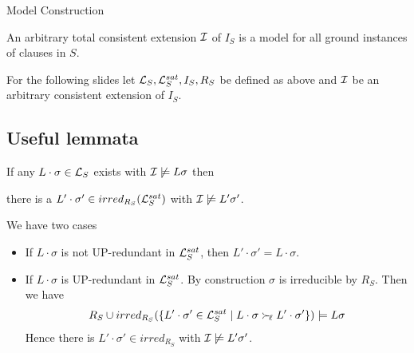 \documentclass[%
handout,
]{beamer}
\begin{document}
\begin{frame}[allowframebreaks]{Model Construction}
        \vspace{1.4em}

        \begin{conjecture}
            An arbitrary total consistent extension $\mathcal{I}$ of $I_S$
            is a model for all ground instances of clauses in $S$.
        \end{conjecture}
        \vspace{1.4em}

        For the following slides let $\mathcal{L}_S,\mathcal{L}_S^{sat}, I_S, R_S$ be defined as above
        and $\mathcal{I}$ be an arbitrary consistent extension of $I_S$.
\end{frame}

\subsection{Useful lemmata}

\begin{frame}
    \begin{lemma}\label{existence}

    If any $L\cdot\sigma\in\mathcal{L}_S$ exists with $\mathcal{I}\not\models L\sigma$ then

    there is a $L'\cdot\sigma'\in irred_{R_S}(\mathcal{L}_S^{sat})$ with $\mathcal{I}\not\models L'\sigma'$.
    \end{lemma}

    \begin{Proof}
        We have two cases

    \begin{itemize}
        \item If $L\cdot\sigma$ is not UP-redundant in $\mathcal{L}_S^{sat}$,
        then $L'\cdot\sigma' = L\cdot\sigma$.

        \item If $L\cdot\sigma$ is UP-redundant in $\mathcal{L}_S^{sat}$.
    By construction $\sigma$ is irreducible by $R_S$. Then we have
    \begin{align*}
        R_S \cup irred_{R_S}(
            \{
            L'\cdot\sigma'\in\mathcal{L}_S^{sat}
            \mid
            L\cdot\sigma \mathrel\succ_{\!\ell} L'\cdot\sigma'
            \}
        )
        \models
        L\sigma
    \end{align*}
    Hence there is $L'\cdot\sigma'\in irred_{R_S}$ with $\mathcal{I}\not\models L'\sigma'$.
    \end{itemize}
\end{Proof}
\end{frame}
\end{document}
